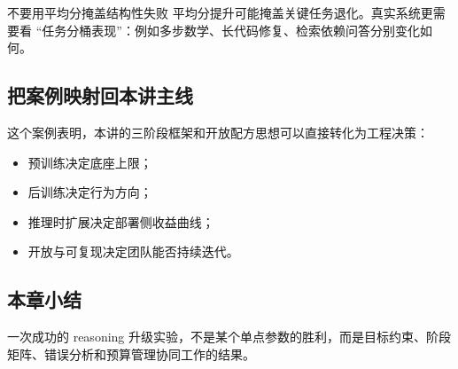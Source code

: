 \begin{warningbox}{不要用平均分掩盖结构性失败}
平均分提升可能掩盖关键任务退化。真实系统更需要看 ``任务分桶表现''：例如多步数学、长代码修复、检索依赖问答分别变化如何。
\end{warningbox}

\subsection{把案例映射回本讲主线}
这个案例表明，本讲的三阶段框架和开放配方思想可以直接转化为工程决策：
\begin{itemize}
    \item 预训练决定底座上限；
    \item 后训练决定行为方向；
    \item 推理时扩展决定部署侧收益曲线；
    \item 开放与可复现决定团队能否持续迭代。
\end{itemize}

\subsection{本章小结}
一次成功的 reasoning 升级实验，不是某个单点参数的胜利，而是目标约束、阶段矩阵、错误分析和预算管理协同工作的结果。


